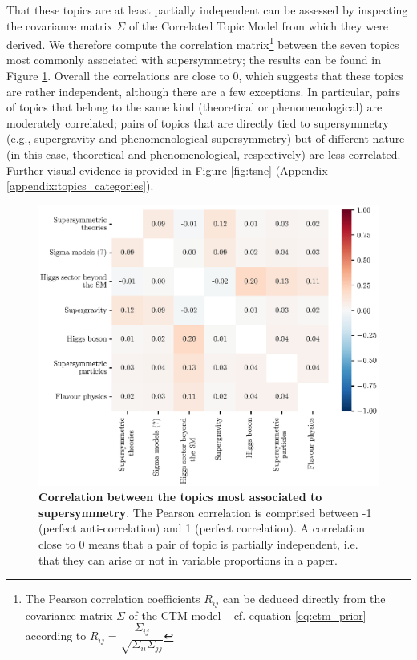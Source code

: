 \documentclass[smallextended]{svjour3}
\begin{document}
That these topics are at least partially independent can be assessed by inspecting the covariance matrix $\Sigma$ of the Correlated Topic Model from which they were derived. We therefore compute the correlation matrix\footnote{The Pearson correlation coefficients $R_{ij}$ can be deduced directly from the covariance matrix $\Sigma$ of the CTM model -- cf. equation \eqref{eq:ctm_prior} -- according to $R_{ij} = \dfrac{\Sigma_{ij}}{\sqrt{\Sigma_{ii}\Sigma_{jj}}}$} between the seven topics most commonly associated with supersymmetry; the results can be found in Figure \ref{fig:susy_correlations}. Overall the correlations are close to 0, which suggests that these topics are rather independent, although there are a few exceptions. In particular, pairs of topics that belong to the same kind (theoretical or phenomenological) are moderately correlated; pairs of topics that are directly tied to supersymmetry (e.g., supergravity and phenomenological supersymmetry) but of different nature (in this case, theoretical and phenomenological, respectively) are less correlated. Further visual evidence is provided in Figure \ref{fig:tsne} (Appendix \ref{appendix:topics_categories}).

\begin{figure}
    \centering
    \hspace*{-2em}\includegraphics{Fig4.eps}
    \caption{\textbf{Correlation between the topics most associated to supersymmetry}. The Pearson correlation is comprised between -1 (perfect anti-correlation) and 1 (perfect correlation). A correlation close to 0 means that a pair of topic is partially independent, i.e. that they can arise or not in variable proportions in a paper.}
    \label{fig:susy_correlations}
\end{figure}
\end{document}
